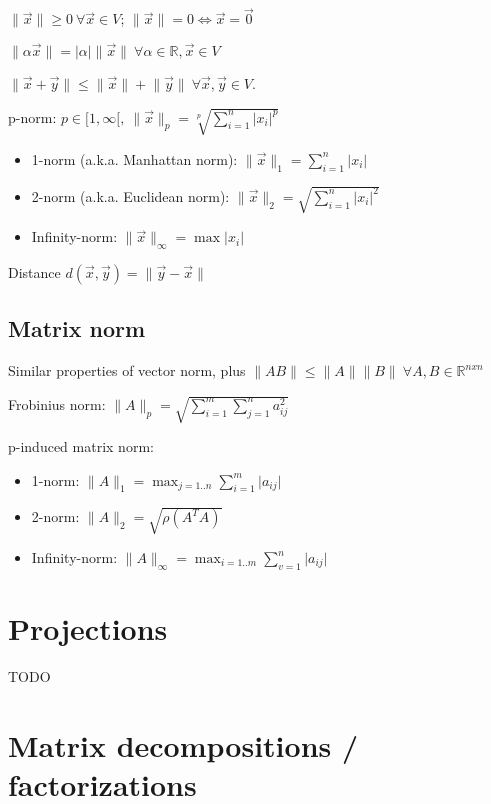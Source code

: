 \documentclass[]{article}
\begin{document}
	$\lVert \vec{x} \rVert \ge 0 \ \forall \vec{x} \in V$;
	$\lVert \vec{x} \rVert=0 \iff \vec{x}=\vec{0}$
	
	$\lVert \alpha \vec{x} \rVert = \lvert \alpha \rvert \lVert \vec{x} \rVert \ \forall \alpha \in \mathbb{R}, \vec{x} \in V$
	
	$\lVert \vec{x}+\vec{y} \rVert \le \lVert \vec{x} \rVert + \lVert \vec{y} \rVert \ \forall \vec{x},\vec{y} \in V$.
	
	p-norm: $p\in [1,\infty[, \ \lVert \vec{x} \rVert_p = \sqrt[p]{\sum_{i=1}^n \lvert x_i \rvert^p}$
	\begin{itemize}
		\item 1-norm (a.k.a. Manhattan norm): $\lVert \vec{x} \rVert_1 = \sum_{i=1}^n \lvert x_i \rvert$
		\item 2-norm (a.k.a. Euclidean norm): $\lVert \vec{x} \rVert_2 = \sqrt{\sum_{i=1}^n \lvert x_i \rvert^2}$
		\item Infinity-norm: $\lVert \vec{x} \rVert_\infty = \max{\lvert x_i \rvert}$
	\end{itemize}

	Distance $d(\vec{x},\vec{y}) = \lVert \vec{y}-\vec{x} \rVert$

	\subsection{Matrix norm}
	
	Similar properties of vector norm, plus $\lVert A B \rVert \le \lVert A \rVert \lVert B \rVert \ \forall A,B\in \mathbb{R}^{nxn}$
	 
	Frobinius norm: $\lVert A \rVert_p = \sqrt{\sum_{i=1}^m \sum_{j=1}^n a_{ij}^2}$
	
	p-induced matrix norm: 
	\begin{itemize}
		\item 1-norm: $\lVert A \rVert_1 = \max_{j=1..n}\sum_{i=1}^m \lvert a_{ij} \rvert$
		\item 2-norm: $\lVert A \rVert_2 = \sqrt{\rho(A^T A)}$
		\item Infinity-norm: $\lVert A \rVert_\infty = \max_{i=1..m}\sum_{v=1}^n \lvert a_{ij} \rvert$
	\end{itemize}
	
	\section{Projections}
	
	TODO
	
	\section{Matrix decompositions / factorizations}
	
\end{document}

